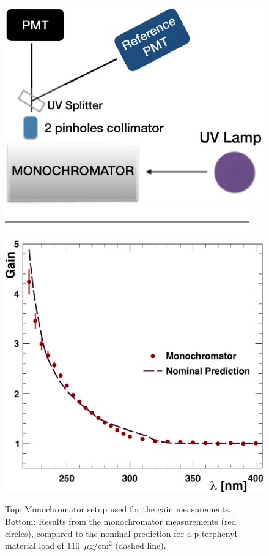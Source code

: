 \begin{figure}[ht]
	\centering
	\includegraphics[width=0.99\columnwidth, height=0.65\columnwidth]{img/pmtTestingSetup.png}
	\includegraphics[width=0.99\columnwidth, keepaspectratio]{img/blank.png}
	\includegraphics[width=0.99\columnwidth, keepaspectratio]{img/ptQEResults.png}
	\caption{Top: Monochromator setup used for the gain measurements. Bottom: Results from the monochromator
          measurements (red circles), compared to the nominal prediction for a p-terphenyl material load of
          110~$\mu$g/cm$^2$ (dashed line).}
	\label{fig:pmtTestingSetupAndptQEResults}
\end{figure}

